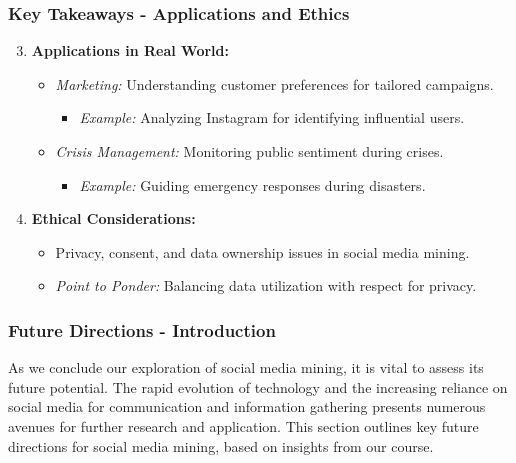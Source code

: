 \documentclass{beamer}
\begin{document}
\begin{frame}[fragile]
    \frametitle{Key Takeaways - Applications and Ethics}
    \begin{enumerate}
        \setcounter{enumi}{2}
        \item \textbf{Applications in Real World:}
            \begin{itemize}
                \item \textit{Marketing:} Understanding customer preferences for tailored campaigns.
                    \begin{itemize}
                        \item \textit{Example:} Analyzing Instagram for identifying influential users.
                    \end{itemize}
                \item \textit{Crisis Management:} Monitoring public sentiment during crises.
                    \begin{itemize}
                        \item \textit{Example:} Guiding emergency responses during disasters.
                    \end{itemize}
            \end{itemize}
        
        \item \textbf{Ethical Considerations:}
            \begin{itemize}
                \item Privacy, consent, and data ownership issues in social media mining.
                \item \textit{Point to Ponder:} Balancing data utilization with respect for privacy.
            \end{itemize}
    \end{enumerate}
\end{frame}

\begin{frame}[fragile]
    \frametitle{Future Directions - Introduction}
    As we conclude our exploration of social media mining, it is vital to assess its future potential. The rapid evolution of technology and the increasing reliance on social media for communication and information gathering presents numerous avenues for further research and application. This section outlines key future directions for social media mining, based on insights from our course.
\end{frame}
\end{document}
